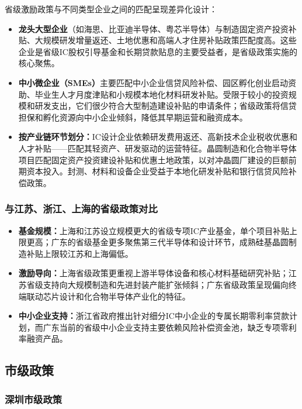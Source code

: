 \documentclass[12pt,a4paper]{article}
\begin{document}
省级激励政策与不同类型企业之间的匹配呈现差异化设计：

\begin{itemize}
    \item \textbf{龙头大型企业}（如海思、比亚迪半导体、粤芯半导体）与制造固定资产投资补贴、大规模研发增量返还、土地优惠和高端人才住房补贴政策匹配度高。这些企业是省级IC股权引导基金和长期贷款贴息的主要受益者，是省级政策实施的核心聚焦。
    \item \textbf{中小微企业（SMEs）}主要匹配中小企业信贷风险补偿、园区孵化创业启动资助、毕业生人才月度津贴和小规模本地化材料研发补贴。受限于较小的投资规模和研发支出，它们很少符合大型制造建设补贴的申请条件；省级政策将信贷担保和孵化资源向中小企业倾斜，降低其早期运营和融资成本。
    \item \textbf{按产业链环节划分：}IC设计企业依赖研发费用返还、高新技术企业税收优惠和人才补贴——匹配其轻资产、研发驱动的运营特征。晶圆制造和化合物半导体项目匹配固定资产投资建设补贴和优惠土地政策，以对冲晶圆厂建设的巨额前期资本投入。封测、材料和设备企业受益于本地化研发补贴和银行信贷风险补偿政策。
\end{itemize}

\subsubsection{与江苏、浙江、上海的省级政策对比}

\begin{itemize}
    \item \textbf{基金规模：}上海和江苏设立规模更大的省级专项IC产业基金，单个项目补贴上限更高；广东的省级基金更多聚焦第三代半导体和设计环节，成熟硅基晶圆制造补贴上限较江苏和上海偏低。
    \item \textbf{激励导向：}上海省级政策更重视上游半导体设备和核心材料基础研究补贴；江苏省级支持向大规模制造和先进封装产能扩张倾斜；广东省级政策呈现偏向终端联动芯片设计和化合物半导体产业化的特征。
    \item \textbf{中小企业支持：}浙江省政府推出针对细分IC中小企业的专属长期零利率贷款计划，而广东当前的省级中小企业支持主要依赖风险补偿资金池，缺乏专项零利率融资产品。
\end{itemize}

\subsection{市级政策}
\label{sec:municipal_policy}

\subsubsection{深圳市级政策}
\end{document}
